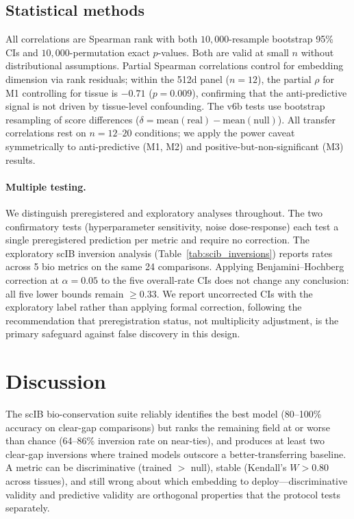 \documentclass[10pt,letterpaper]{article}
\begin{document}
\subsection{Statistical methods}

All correlations are Spearman rank with both $10{,}000$-resample bootstrap 95\% CIs and $10{,}000$-permutation exact $p$-values. Both are valid at small $n$ without distributional assumptions. Partial Spearman correlations control for embedding dimension via rank residuals; within the 512d panel ($n = 12$), the partial $\rho$ for M1 controlling for tissue is $-0.71$ ($p = 0.009$), confirming that the anti-predictive signal is not driven by tissue-level confounding. The v6b tests use bootstrap resampling of score differences ($\delta = \text{mean}(\text{real}) - \text{mean}(\text{null})$). All transfer correlations rest on $n = 12$--$20$ conditions; we apply the power caveat symmetrically to anti-predictive (M1, M2) and positive-but-non-significant (M3) results.

\paragraph{Multiple testing.} We distinguish preregistered and exploratory analyses throughout. The two confirmatory tests (hyperparameter sensitivity, noise dose-response) each test a single preregistered prediction per metric and require no correction. The exploratory scIB inversion analysis (Table~\ref{tab:scib_inversions}) reports rates across 5 bio metrics on the same 24 comparisons. Applying Benjamini--Hochberg correction at $\alpha = 0.05$ to the five overall-rate CIs does not change any conclusion: all five lower bounds remain $\geq 0.33$. We report uncorrected CIs with the exploratory label rather than applying formal correction, following the recommendation that preregistration status, not multiplicity adjustment, is the primary safeguard against false discovery in this design.


\section{Discussion}

The scIB bio-conservation suite reliably identifies the best model (80--100\% accuracy on clear-gap comparisons) but ranks the remaining field at or worse than chance (64--86\% inversion rate on near-ties), and produces at least two clear-gap inversions where trained models outscore a better-transferring baseline. A metric can be discriminative (trained $>$ null), stable (Kendall's $W > 0.80$ across tissues), and still wrong about which embedding to deploy---discriminative validity and predictive validity are orthogonal properties that the protocol tests separately.
\end{document}
